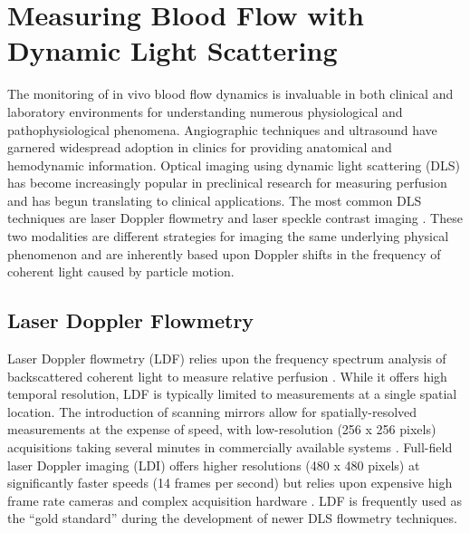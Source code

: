 \section{Measuring Blood Flow with Dynamic Light Scattering}

The monitoring of in vivo blood flow dynamics is invaluable in both clinical and laboratory environments for understanding numerous physiological and pathophysiological phenomena. Angiographic techniques and ultrasound have garnered widespread adoption in clinics for providing anatomical and hemodynamic information. Optical imaging using dynamic light scattering (DLS) has become increasingly popular in preclinical research for measuring perfusion and has begun translating to clinical applications. The most common DLS techniques are laser Doppler flowmetry and laser speckle contrast imaging \cite{Briers:2001hy, Dunn:2011gi}. These two modalities are different strategies for imaging the same underlying physical phenomenon and are inherently based upon Doppler shifts in the frequency of coherent light caused by particle motion.

\subsection{Laser Doppler Flowmetry}

Laser Doppler flowmetry (LDF) relies upon the frequency spectrum analysis of backscattered coherent light to measure relative perfusion \cite{Briers:2001hy}. While it offers high temporal resolution, LDF is typically limited to measurements at a single spatial location. The introduction of scanning mirrors allow for spatially-resolved measurements at the expense of speed, with low-resolution (256 x 256 pixels) acquisitions taking several minutes in commercially available systems \cite{Rajan:2008di}. Full-field laser Doppler imaging (LDI) offers higher resolutions (480 x 480 pixels) at significantly faster speeds (14 frames per second) but relies upon expensive high frame rate cameras and complex acquisition hardware \cite{Lopez:2011bk}. LDF is frequently used as the ``gold standard'' during the development of newer DLS flowmetry techniques.

